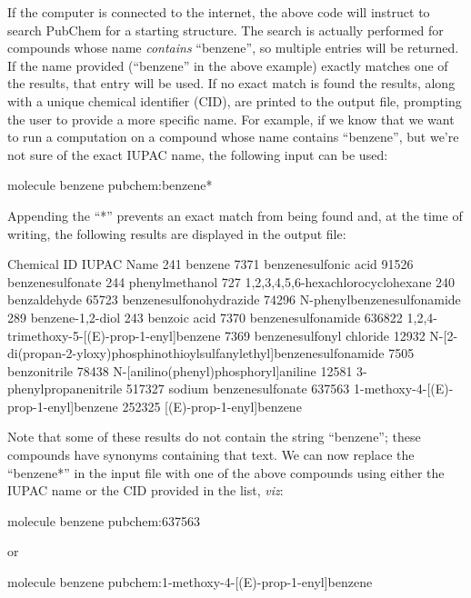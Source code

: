 If the computer is connected to the internet, the above code will instruct
\PSIfour to search PubChem for a starting structure.  The search is actually
performed for compounds whose name {\it contains} ``benzene'', so multiple
entries will be returned.  If the name provided (``benzene'' in the above
example) exactly matches one of the results, that entry will be used.  If no
exact match is found the results, along with a unique chemical identifier
(CID), are printed to the output file, prompting the user to provide a more
specific name.  For example, if we know that we want to run a computation on a
compound whose name contains ``benzene'', but we're not sure of the exact IUPAC
name, the following input can be used:
\begin{Snippet}
molecule benzene {
    pubchem:benzene*
}
\end{Snippet}
Appending the ``*'' prevents an exact match from being found and, at the time
of writing, the following results are displayed in the output file:
\begin{Snippet}
     Chemical ID     IUPAC Name
              241   benzene
             7371   benzenesulfonic acid
            91526   benzenesulfonate
              244   phenylmethanol
              727   1,2,3,4,5,6-hexachlorocyclohexane
              240   benzaldehyde
            65723   benzenesulfonohydrazide
            74296   N-phenylbenzenesulfonamide
              289   benzene-1,2-diol
              243   benzoic acid
             7370   benzenesulfonamide
           636822   1,2,4-trimethoxy-5-[(E)-prop-1-enyl]benzene
             7369   benzenesulfonyl chloride
            12932   N-[2-di(propan-2-yloxy)phosphinothioylsulfanylethyl]benzenesulfonamide
             7505   benzonitrile
            78438   N-[anilino(phenyl)phosphoryl]aniline
            12581   3-phenylpropanenitrile
           517327   sodium benzenesulfonate
           637563   1-methoxy-4-[(E)-prop-1-enyl]benzene
           252325   [(E)-prop-1-enyl]benzene
\end{Snippet}
Note that some of these results do not contain the string ``benzene''; these
compounds have synonyms containing that text.  We can now replace the
``benzene*'' in the input file with one of the above compounds using either the
IUPAC name or the CID provided in the list, {\it viz}:
\begin{Snippet}
molecule benzene {
    pubchem:637563
}

 or

molecule benzene {
    pubchem:1-methoxy-4-[(E)-prop-1-enyl]benzene
}
\end{Snippet}

